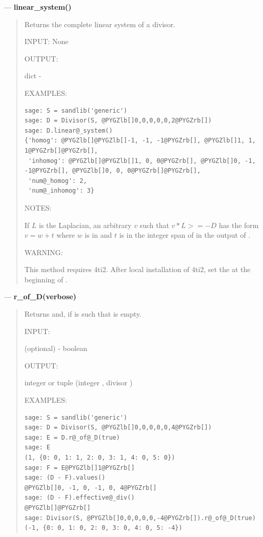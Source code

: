 \documentclass[letterpaper,10pt,english]{manual}
\begin{document}
---
\hypertarget{linear-system}{}
\textbf{linear\_system()}
\begin{quote}

Returns the complete linear system of a divisor.

INPUT: None

OUTPUT:

dict - 

EXAMPLES:

\begin{Verbatim}[commandchars=@\[\]]
sage: S = sandlib('generic')
sage: D = Divisor(S, @PYGZlb[]0,0,0,0,0,2@PYGZrb[])
sage: D.linear@_system()
{'homog': @PYGZlb[]@PYGZlb[]-1, -1, -1@PYGZrb[], @PYGZlb[]1, 1, 1@PYGZrb[]@PYGZrb[],
 'inhomog': @PYGZlb[]@PYGZlb[]1, 0, 0@PYGZrb[], @PYGZlb[]0, -1, -1@PYGZrb[], @PYGZlb[]0, 0, 0@PYGZrb[]@PYGZrb[],
 'num@_homog': 2,
 'num@_inhomog': 3}
\end{Verbatim}

NOTES:

If $L$ is the Laplacian, an arbitrary $v$ such that $v * L>= -D$
has the form $v = w + t$ where $w$ is in  and $t$ is in the
integer span of  in the output of .

WARNING:

This method requires 4ti2.  After local installation of 4ti2, set the
 at the beginning of .
\end{quote}

---
\hypertarget{r-of-d-verbose}{}
\textbf{r\_of\_D(verbose)}
\begin{quote}

Returns  and, if  is  such that  is empty.

INPUT:

 (optional) - boolean

OUTPUT:

integer  or tuple (integer , divisor )

EXAMPLES:

\begin{Verbatim}[commandchars=@\[\]]
sage: S = sandlib('generic')
sage: D = Divisor(S, @PYGZlb[]0,0,0,0,0,4@PYGZrb[])
sage: E = D.r@_of@_D(true)
sage: E
(1, {0: 0, 1: 1, 2: 0, 3: 1, 4: 0, 5: 0})
sage: F = E@PYGZlb[]1@PYGZrb[]
sage: (D - F).values()
@PYGZlb[]0, -1, 0, -1, 0, 4@PYGZrb[]
sage: (D - F).effective@_div()
@PYGZlb[]@PYGZrb[]
sage: Divisor(S, @PYGZlb[]0,0,0,0,0,-4@PYGZrb[]).r@_of@_D(true)
(-1, {0: 0, 1: 0, 2: 0, 3: 0, 4: 0, 5: -4})
\end{Verbatim}
\end{quote}
\end{document}
